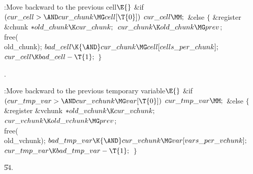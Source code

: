 \B{}:Move  backward to the previous cell\X${}\E{}$\6
\&{if} ${}(\\{cur\_cell}>{\AND}\\{cur\_chunk}\MG\\{cell}[\T{0}]){}$\1\5
${}\\{cur\_cell}\MM;{}$\2\6
\&{else}\5
${}\{{}$\1\6
\&{register} \&{chunk} ${}{*}\\{old\_chunk}\K\\{cur\_chunk};{}$\7
${}\\{cur\_chunk}\K\\{old\_chunk}\MG\\{prev}{}$;\5
\\{free}(\\{old\_chunk});\6
${}\\{bad\_cell}\K{\AND}\\{cur\_chunk}\MG\\{cell}[\\{cells\_per\_chunk}];{}$\6
${}\\{cur\_cell}\K\\{bad\_cell}-\T{1};{}$\6
\4${}\}{}$\2\par
{}.\fi

\B{}:Move  backward to the previous temporary
variable\X${}\E{}$\6
\&{if} ${}(\\{cur\_tmp\_var}>{\AND}\\{cur\_vchunk}\MG\\{var}[\T{0}]){}$\1\5
${}\\{cur\_tmp\_var}\MM;{}$\2\6
\&{else}\5
${}\{{}$\1\6
\&{register} \&{vchunk} ${}{*}\\{old\_vchunk}\K\\{cur\_vchunk};{}$\7
${}\\{cur\_vchunk}\K\\{old\_vchunk}\MG\\{prev}{}$;\5
\\{free}(\\{old\_vchunk});\6
${}\\{bad\_tmp\_var}\K{\AND}\\{cur\_vchunk}\MG\\{var}[\\{vars\_per%
\_vchunk}];{}$\6
${}\\{cur\_tmp\_var}\K\\{bad\_tmp\_var}-\T{1};{}$\6
\4${}\}{}$\2\par
\U54.\fi

